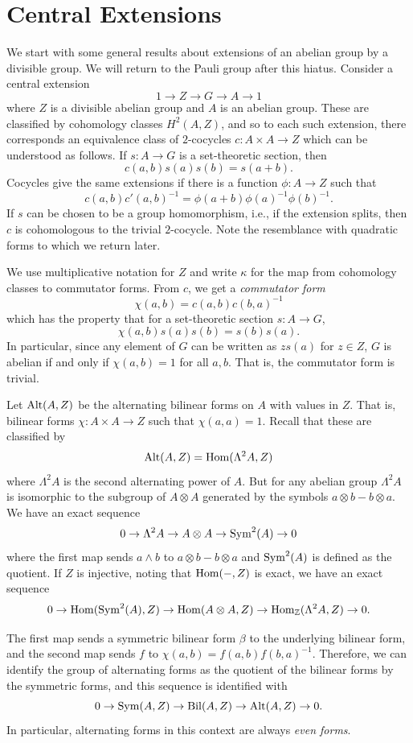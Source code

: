 \documentclass[11pt]{amsart}
\begin{document}
\section{Central Extensions}\label{sec:central}
We start with some general results about extensions of an abelian group  by a divisible group. We will return to the Pauli group after this hiatus. Consider a central extension
\[ 1 \to Z \to G \to A \to 1 \]
where $Z$ is a divisible abelian group and $A$ is an abelian group. These are classified by cohomology classes $H^2(A,Z)$, and so to each such extension, there corresponds an equivalence class of $2$-cocycles $c \colon A \times A \to Z$ which can be understood as follows. If $s\colon A \to G$ is a set-theoretic section, then
\[ c(a,b) s(a) s(b)= s(a+b).\]
Cocycles give the same extensions if there is a function $\phi \colon A \to Z$ such that
\[ c(a,b) c'(a,b)^{-1} = \phi(a+b)  \phi(a)^{-1} \phi(b)^{-1}.\]
If $s$ can be chosen to be a group homomorphism, i.e., if the extension splits, then $c$ is cohomologous to the trivial $2$-cocycle.
Note the resemblance with quadratic forms to which we return later.

We use multiplicative notation for $Z$ and write $\kappa$ for the map from cohomology classes to commutator forms. From $c$, we get a \emph{commutator form}
\[\chi(a,b) = c(a,b)  c(b,a)^{-1}\]
which has the property that for a set-theoretic section $s \colon A \to G$,
\[ \chi(a,b) s(a)s(b) =s(b)s(a)  .\]
In particular,  since any element of $G$ can be written as $zs(a)$ for $z\in Z$,  $G$ is abelian if and only if $\chi(a,b)=1$ for all $a,b$. That is, the commutator form is trivial.

Let $\mathrm{Alt}(A, Z)$ be the alternating bilinear forms on $A$ with values in $Z$. That is, bilinear forms $\chi \colon A \times A \to Z$ such that $\chi(a,a)=1$. Recall that these are classified by
\[ \mathrm{Alt}(A, Z) = \operatorname{Hom}(\Lambda^2A,Z)\]
where $\Lambda^2A$ is the second alternating power of $A$. But for any abelian group $\Lambda^2A$ is isomorphic to the subgroup of $A\otimes A$ generated by the symbols $a\otimes b -b\otimes a$. We have an exact sequence
\[ 0 \to \Lambda^2A \to A\otimes A \to \mathrm{Sym}^2(A) \to 0 \]
where the first map sends $a \wedge b$ to $a\otimes b-b\otimes a$ and $\mathrm{Sym}^2(A)$ is defined as the quotient.  If $Z$ is injective, noting that $\operatorname{Hom}(-,Z)$ is exact, we have an exact sequence
\[ 0 \to \operatorname{Hom}(\mathrm{Sym}^2(A),Z) \to \operatorname{Hom}(A\otimes A, Z) \to \operatorname{Hom}_{\mathbb{Z}}(\Lambda^2 A,Z)  \to 0 .\]

The first map sends a symmetric bilinear form $\beta$ to the underlying bilinear form, and the second map sends $f$ to $\chi(a,b) = f(a,b)f(b,a)^{-1}$. Therefore, we can identify the group of alternating forms as the quotient of the bilinear forms by the symmetric forms, and this sequence is identified with
\[ 0 \to \mathrm{Sym}(A,Z) \to \mathrm{Bil}(A,Z) \to \mathrm{Alt}(A,Z) \to 0.\]
In particular, alternating forms in this context are always \emph{even forms}.
\end{document}
